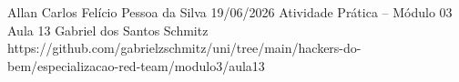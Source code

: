 \documentclass{article}
\begin{document}
{Allan Carlos Felício Pessoa da Silva}
{19/06/2026}
{Atividade Prática -- Módulo 03}
{Aula 13}
{Gabriel dos Santos Schmitz}
{https://github.com/gabrielzschmitz/uni/tree/main/hackers-do-bem/especializacao-red-team/modulo3/aula13}





\newpage
\printbibliography[title=Referências]
\end{document}
